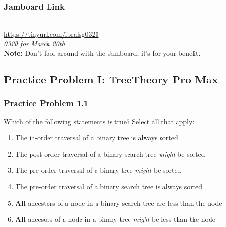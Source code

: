 \documentclass[hyperref={colorlinks,citecolor=blue,linkcolor=blue,urlcolor=blue}, aspectratio=1610]{beamer}
\begin{document}
\begin{frame}
  \frametitle{Jamboard Link}
  \begin{center}
    \\
    \url{https://tinyurl.com/ibrafsg0320}\\
    \textit{0320 for March 20th}\\
    \textbf{Note:} Don't fool around with the Jamboard, it's for your benefit.
  \end{center}
\end{frame}

\subsection{Practice Problem I: TreeTheory Pro Max}

\begin{frame}[fragile]
  
  \frametitle{Practice Problem 1.1}
  Which of the following statements is true? Select all that apply:  
  \begin{enumerate}
    \item The in-order traversal of a binary tree is always sorted
    \item The post-order traversal of a binary search tree \textit{might} be sorted
    \item The pre-order traversal of a binary tree \textit{might} be sorted
    \item The pre-order traversal of a binary search tree is always sorted
    \item \textbf{All} ancestors of a node in a binary search tree are less than the node
    \item \textbf{All} ancesors of a node in a binary tree \textit{might} be less than the node
  \end{enumerate}
\end{frame}
\end{document}
